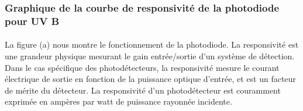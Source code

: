 \documentclass{article}
\begin{document}
    \subsubsection{Graphique de la courbe de responsivité de la photodiode pour UV B}

    \paragraph{}
    La figure (a) nous montre le fonctionnement de la photodiode. La responsivité est une grandeur physique mesurant le gain entrée/sortie d'un système de détection. Dans le cas spécifique des photodétecteurs, la responsivité mesure le courant électrique de sortie en fonction de la puissance optique d'entrée, et est un facteur de mérite du détecteur. La responsivité d'un photodétecteur est couramment exprimée en ampères par watt de puissance rayonnée incidente.
\end{document}
